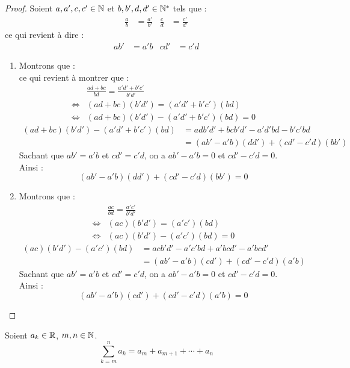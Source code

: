 \begin{proof}
	Soient $a, a', c, c' \in \mathbb{N}$ et $b, b', d, d' \in \mathbb{N}^*$ tels que :
	\begin{align*}
		\frac{a}{b} &= \frac{a'}{b'} & \frac{c}{d} &= \frac{c'}{d'}
	\end{align*}
	ce qui revient à dire :
	\begin{align*}
		ab' &= a'b & cd' &= c'd
	\end{align*}
	\begin{enumerate}
		\item Montrons que :
		\[  \]
		ce qui revient à montrer que :
		\begin{align*}
			&\frac{ad + bc}{bd} = \frac{a'd' + b'c'}{b'd'} \\
			\iff &(ad + bc)(b'd') = (a'd' + b'c')(bd)
			\\
			\iff &(ad + bc)(b'd') - (a'd' + b'c')(bd) = 0
		\end{align*}
		\begin{align*}
			(ad + bc)(b'd') - (a'd' + b'c')(bd) &= adb'd' + bcb'd' - a'd'bd - b'c'bd \\
			&= (ab' - a'b)(dd') + (cd' - c'd)(bb')
		\end{align*}
		Sachant que $ab' = a'b$ et $cd' = c'd$, on a $ab' - a'b = 0$ et $cd' - c'd = 0$.
		\\
		Ainsi :
		\[ (ab' - a'b)(dd') + (cd' - c'd)(bb') = 0 \]
		\item Montrons que :
		\begin{align*}
			&\frac{ac}{bd} = \frac{a'c'}{b'd'} \\
			\iff &(ac)(b'd') = (a'c')(bd) \\
			\iff &(ac)(b'd') - (a'c')(bd) = 0
		\end{align*}
		\begin{align*}
			(ac)(b'd') - (a'c')(bd) &= acb'd' - a'c'bd + a'bcd' - a'bcd' \\
			&= (ab' - a'b)(cd') + (cd' - c'd)(a'b) 
		\end{align*}
		Sachant que $ab' = a'b$ et $cd' = c'd$, on a $ab' - a'b = 0$ et $cd' - c'd = 0$.
		\\
		Ainsi :
		\[ (ab' - a'b)(cd') + (cd' - c'd)(a'b) = 0 \]
	\end{enumerate}
\end{proof}

\begin{definition}[Somme]
    Soient $a_k \in \mathbb{R}$, $m, n \in \mathbb{N}$.
    \[ \sum_{k = m}^n a_k = a_m + a_{m + 1} + \cdots + a_n \]
\end{definition}

